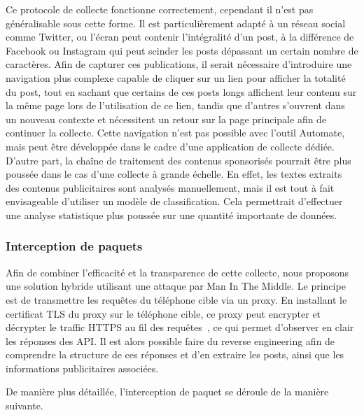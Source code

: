 \documentclass[runningheads]{llncs}
\begin{document}
Ce protocole de collecte fonctionne correctement, cependant il n'est pas généralisable sous cette forme. Il est particulièrement adapté à un réseau social comme Twitter, ou l'écran peut contenir l'intégralité d'un post, à la différence de Facebook ou Instagram qui peut scinder les posts dépassant un certain nombre de caractères. Afin de capturer ces publications, il serait nécessaire d'introduire une navigation plus complexe capable de cliquer sur un lien pour afficher la totalité du post, tout en sachant que certains de ces posts longs affichent leur contenu sur la même page lors de l'utilisation de ce lien, tandis que d'autres s'ouvrent dans un nouveau contexte et nécessitent un retour sur la page principale afin de continuer la collecte. Cette navigation n'est pas possible avec l'outil Automate, mais peut être développée dans le cadre d'une application de collecte dédiée.
D'autre part, la chaîne de traitement des contenus sponsorisés pourrait être plus poussée dans le cas d'une collecte à grande échelle. En effet, les textes extraits des contenus publicitaires sont analysés manuellement, mais il est tout à fait envisageable d'utiliser un modèle de classification. Cela permettrait d'effectuer une analyse statistique plus poussée sur une quantité importante de données.

\subsubsection{Interception de paquets}

Afin de combiner l'efficacité et la transparence de cette collecte, nous proposons une solution hybride utilisant une attaque par Man In The Middle.
Le principe est de transmettre les requêtes du téléphone cible via un proxy. En installant le certificat TLS du proxy sur le téléphone cible, ce proxy peut encrypter et décrypter le traffic HTTPS au fil des requêtes~\cite{noauthor_mitmproxy_2020}, ce qui permet d'observer en clair les réponses des API. Il est alors possible faire du reverse engineering afin de comprendre la structure de ces réponses et d'en extraire les posts, ainsi que les informations publicitaires associées. 

De manière plus détaillée, l'interception de paquet se déroule de la manière suivante.
\end{document}
